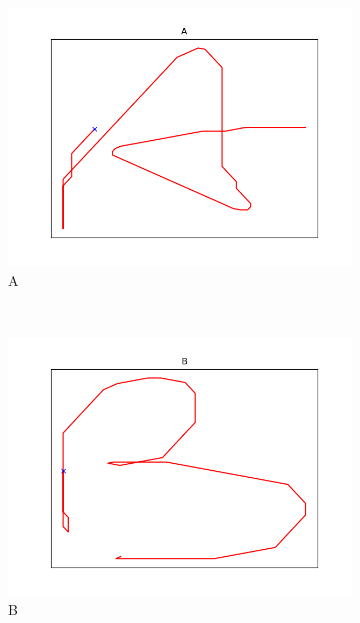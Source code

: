 \begin{figure}
\centering
    \begin{subfigure}[b]{0.14\textwidth}
        \includegraphics[width=\textwidth]{images/gbem/letters_generated/A.png}
        \caption{A}
    \end{subfigure}
    ~ %
    \begin{subfigure}[b]{0.14\textwidth}
        \includegraphics[width=\textwidth]{images/gbem/letters_generated/B.png}
        \caption{B}
    \end{subfigure}
    ~
    \begin{subfigure}[b]{0.14\textwidth}

\end{subfigure}
\end{figure}
